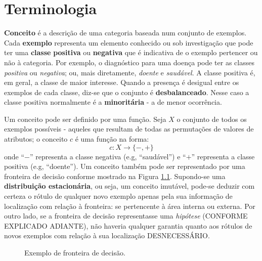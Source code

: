 \chapter{Terminologia}\label{terminologia}

\textbf{Conceito} é a descrição de uma categoria baseada num conjunto de exemplos.
Cada \textbf{exemplo} representa um elemento conhecido ou sob investigação que
pode ter uma \textbf{classe} \textbf{positiva} ou \textbf{negativa} que é indicativa
de o exemplo pertencer ou não à categoria.
Por exemplo, o diagnóstico para uma doença pode ter as classes \textit{positiva}
ou \textit{negativa}; ou, mais diretamente, \textit{doente} e \textit{saudável}.
A classe positiva é, em geral, a classe de maior interesse.
Quando a presença é desigual entre os exemplos de cada classe, diz-se que o
conjunto é \textbf{desbalanceado}.
Nesse caso a classe positiva normalmente é a \textbf{minoritária} -
a de menor ocorrência.


Um conceito pode ser definido por uma função.
Seja $X$ o conjunto de todos os exemplos possíveis - aqueles que resultam de todas as permutações de valores de atributos;
o conceito $c$ é uma função na forma:
\begin{equation}
c: X \rightarrow \{-,+\}
\end{equation}
onde ``$-$'' representa a classe negativa (e.g, ``saudável'') e ``$+$'' representa a classe positiva (e.g, ``doente'').
Um conceito também pode ser
representado
por uma fronteira de decisão conforme mostrado na Figura \ref{fig:fronteiras}.
Supondo-se uma \textbf{distribuição estacionária}, ou seja, um conceito imutável, pode-se deduzir com certeza o rótulo de qualquer novo exemplo apenas pela sua informação de localização com relação à fronteira: se pertencente à área interna ou externa.
Por outro lado, se a fronteira de decisão representasse uma \textit{hipótese} (CONFORME EXPLICADO ADIANTE),
não haveria qualquer garantia quanto aos rótulos de novos exemplos com relação à sua localização DESNECESSÁRIO.

\pgfplotsset{width=12cm,compat=1.5.1}
\begin{figure}
\begin{center}
\caption{Exemplo de fronteira de decisão.}
\label{fig:fronteiras}
\end{center}
\end{figure}



